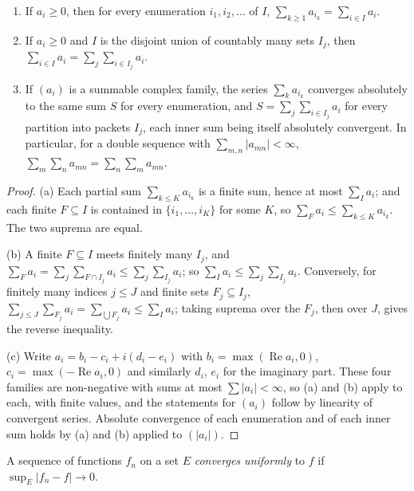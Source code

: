 \begin{lemma}\label{lem:packets}
\begin{enumerate}[label=(\alph*)]
\item If $a_i\ge0$, then for every enumeration $i_1,i_2,\dots$ of $I$, $\sum_{k\ge1}a_{i_k}=\sum_{i\in I}a_i$.
\item If $a_i\ge0$ and $I$ is the disjoint union of countably many sets $I_j$, then $\sum_{i\in I}a_i=\sum_j\sum_{i\in I_j}a_i$.
\item If $(a_i)$ is a summable complex family, the series $\sum_ka_{i_k}$ converges absolutely to the same sum $S$ for every
enumeration, and $S=\sum_j\sum_{i\in I_j}a_i$ for every partition into packets $I_j$, each inner sum being itself absolutely convergent.
In particular, for a double sequence with $\sum_{m,n}|a_{mn}|<\infty$, $\sum_m\sum_na_{mn}=\sum_n\sum_ma_{mn}$.
\end{enumerate}
\end{lemma}
\begin{proof}
(a) Each partial sum $\sum_{k\le K}a_{i_k}$ is a finite sum, hence at most $\sum_Ia_i$; and each finite $F\subseteq I$ is contained in
$\{i_1,\dots,i_K\}$ for some $K$, so $\sum_Fa_i\le\sum_{k\le K}a_{i_k}$. The two suprema are equal.

(b) A finite $F\subseteq I$ meets finitely many $I_j$, and $\sum_Fa_i=\sum_j\sum_{F\cap I_j}a_i\le\sum_j\sum_{I_j}a_i$; so
$\sum_Ia_i\le\sum_j\sum_{I_j}a_i$. Conversely, for finitely many indices $j\le J$ and finite sets $F_j\subseteq I_j$,
$\sum_{j\le J}\sum_{F_j}a_i=\sum_{\bigcup F_j}a_i\le\sum_Ia_i$; taking suprema over the $F_j$, then over $J$, gives the reverse
inequality.

(c) Write $a_i=b_i-c_i+i(d_i-e_i)$ with $b_i=\max(\operatorname{Re}a_i,0)$, $c_i=\max(-\operatorname{Re}a_i,0)$ and similarly $d_i$, $e_i$
for the imaginary part. These four families are non-negative with sums at most $\sum|a_i|<\infty$, so (a) and (b) apply to each,
with finite values, and the statements for $(a_i)$ follow by linearity of convergent series. Absolute convergence of each
enumeration and of each inner sum holds by (a) and (b) applied to $(|a_i|)$.
\end{proof}

A sequence of functions $f_n$ on a set $E$ \emph{converges uniformly} to $f$ if $\sup_E|f_n-f|\to0$.

